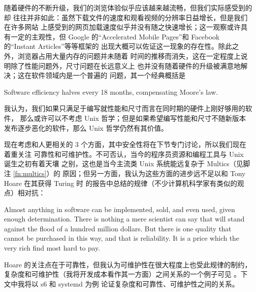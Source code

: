随着硬件的不断升级，我们的浏览体验似乎应该越来越流畅，但我们实际感受到的却
往往并非如此：虽然下载文件的速度和观看视频的分辨率日益增长，但是我们在许多网站
上感受到的网页加载速度似乎并没有随之快速增长；这一观察或许具有一定的主观性，但
Google 的“Accelerated Mobile Pages”和 Facebook 的“Instant Articles”等等框架的
出现大概可以佐证这一现象的存在性。除此之外，浏览器占用大量内存的问题并未随着
时间的推移而消失，这在一定程度上说明除了性能问题外，尺寸问题在长远意义上
也并没有随着硬件的升级被满意地解决；这在软件领域内是一个普遍的
问题，其一个经典概括是
\begin{quoting}
	Software efficiency halves every 18 months, compensating Moore's law.
\end{quoting}
我认为，我们如果只满足于编写就性能和尺寸而言在同时期的硬件上刚好够用的软件，
那么或许可以不考虑 Unix 哲学；但是如果希望编写性能和尺寸不随新版本
发布逐步恶化的软件，那么 Unix 哲学仍然有其价值。

现在考虑和人更相关的 3 个方面，其中安全性将在下节专门讨论，所以我们现在着重关注
可靠性和可维护性。不可否认，当今的程序员资源和编程工具与 Unix 诞生之初有着天壤
之别，这也是当今主流类 Unix 系统能远复杂于 Multics（见脚注 \ref{fn:multics}）的
原因；但另一方面，我认为这些方面的进步远不足以和 Tony Hoare 在其获得 Turing 时
的报告中总结的规律（不少计算机科学家有类似的观点）相对抗：
\begin{quoting}
	Almost anything in software can be implemented, sold, and even used, given
	enough determination.  There is nothing a mere scientist can say that will
	stand against the flood of a hundred million dollars.  But there is one
	quality that cannot be purchased in this way, and that is reliability.
	It is a price which the very rich find most hard to pay.
\end{quoting}
Hoare 的关注点在于可靠性，但我认为可维护性在很大程度上也受此规律的制约，
复杂度和可维护性（我将开发成本看作其一方面）之间关系的一个例子可见
\parencite{rbrander2017}。下文中我将以 s6 和 systemd 为例
论证复杂度和可靠性、可维护性之间的关系。

